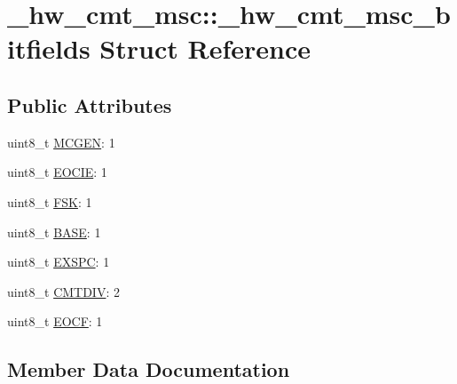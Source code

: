 \hypertarget{struct__hw__cmt__msc_1_1__hw__cmt__msc__bitfields}{}\section{\+\_\+hw\+\_\+cmt\+\_\+msc\+:\+:\+\_\+hw\+\_\+cmt\+\_\+msc\+\_\+bitfields Struct Reference}
\label{struct__hw__cmt__msc_1_1__hw__cmt__msc__bitfields}
\subsection*{Public Attributes}
\begin{DoxyCompactItemize}
\item 
uint8\+\_\+t \hyperlink{struct__hw__cmt__msc_1_1__hw__cmt__msc__bitfields_a210e1d713c948666eae5496a4e37d613}{M\+C\+G\+EN}\+: 1
\item 
uint8\+\_\+t \hyperlink{struct__hw__cmt__msc_1_1__hw__cmt__msc__bitfields_a981da42c6c3826de721e55657ea819d1}{E\+O\+C\+IE}\+: 1
\item 
uint8\+\_\+t \hyperlink{struct__hw__cmt__msc_1_1__hw__cmt__msc__bitfields_a1490cbe72b198d21eecc488b41eee44c}{F\+SK}\+: 1
\item 
uint8\+\_\+t \hyperlink{struct__hw__cmt__msc_1_1__hw__cmt__msc__bitfields_a6bb2e1b1ed3e8cde9d8cbfacce89d892}{B\+A\+SE}\+: 1
\item 
uint8\+\_\+t \hyperlink{struct__hw__cmt__msc_1_1__hw__cmt__msc__bitfields_ac4e8faf7a8109033ffba1dfc6bab3dca}{E\+X\+S\+PC}\+: 1
\item 
uint8\+\_\+t \hyperlink{struct__hw__cmt__msc_1_1__hw__cmt__msc__bitfields_a49a369c8d637b6c122f5791fc8c2420b}{C\+M\+T\+D\+IV}\+: 2
\item 
uint8\+\_\+t \hyperlink{struct__hw__cmt__msc_1_1__hw__cmt__msc__bitfields_a1da3cd8c4fa96778690c4dadff76dbad}{E\+O\+CF}\+: 1
\end{DoxyCompactItemize}


\subsection{Member Data Documentation}
